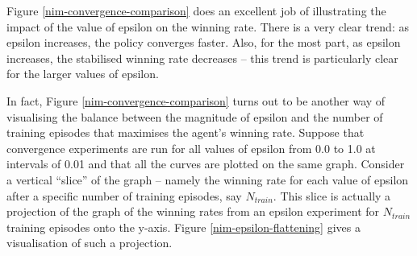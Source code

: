 \documentclass[11pt,a4paper,twoside,openright]{report}
\begin{document}
Figure \ref{nim-convergence-comparison} does an excellent job of illustrating the impact of the value of epsilon on the winning rate. There is a very clear trend: as epsilon increases, the policy converges faster. Also, for the most part, as epsilon increases, the stabilised winning rate decreases -- this trend is particularly clear for the larger values of epsilon.

In fact, Figure \ref{nim-convergence-comparison} turns out to be another way of visualising the balance between the magnitude of epsilon and the number of training episodes that maximises the agent's winning rate. Suppose that convergence experiments are run for all values of epsilon from 0.0 to 1.0 at intervals of 0.01 and that all the curves are plotted on the same graph. Consider a vertical ``slice'' of the graph -- namely the winning rate for each value of epsilon after a specific number of training episodes, say $N_{train}$. This slice is actually a projection of the graph of the winning rates from an epsilon experiment for $N_{train}$ training episodes onto the y-axis. Figure \ref{nim-epsilon-flattening} gives a visualisation of such a projection.
\end{document}
